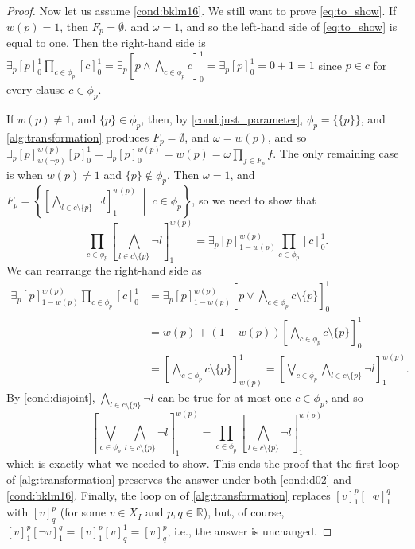 \begin{proof}
  Now let us assume \cref{cond:bklm16}. We still want to prove
  \cref{eq:to_show}. If $w(p) = 1$, then $F_p = \emptyset$, and $\omega = 1$,
  and so the left-hand side of \cref{eq:to_show} is equal to one. Then the
  right-hand side is $\exists_p [p]_0^1 \prod_{c \in \phi_p} [c]_0^1 = \exists_p
  \left[ p \land \bigwedge_{c \in \phi_p} c \right]_0^1 = \exists_p [p]_0^1 = 0
  + 1 = 1$ since $p \in c$ for every clause $c \in \phi_p$.

  If $w(p) \ne 1$, and $\{ p \} \in \phi_p$, then, by
  \cref{cond:just_parameter}, $\phi_p = \{ \{ p \} \}$, and
  \cref{alg:transformation} produces $F_p = \emptyset$, and $\omega = w(p)$, and
  so $\exists_p [p]_{w(\neg p)}^{w(p)} [p]_0^1 = \exists_p [p]^{w(p)}_0 = w(p) =
  \omega \prod_{f \in F_p} f$. The only remaining case is when $w(p) \ne 1$ and
  $\{ p \} \not \in \phi_p$. Then $\omega = 1$, and $F_p = \left\{
    \left[\bigwedge_{l \in c \setminus \{ p \}} \neg l\right]_1^{w(p)}
    \;\middle|\; c \in \phi_p \right\}$, so we need to show that
    \[
    \prod_{c \in \phi_p} \left[\bigwedge_{l \in c \setminus \{p \}} \neg l\right]_1^{w(p)} = \exists_p [p]_{1-w(p)}^{w(p)} \prod_{c \in \phi_p} [c]_0^1.
    \]
    We can rearrange the right-hand side as
  \begin{align*}
    \exists_p [p]_{1-w(p)}^{w(p)} \prod_{c \in \phi_p} [c]_0^1 &= \exists_p [p]_{1-w(p)}^{w(p)} \left[ p \lor \bigwedge_{c \in \phi_p} c \setminus \{ p \} \right]_0^1 \\
                                                               &= w(p) + (1-w(p)) \left[ \bigwedge_{c \in \phi_p} c \setminus \{ p \} \right]_0^1 \\
                                                               &= \left[ \bigwedge_{c \in \phi_p} c \setminus \{ p \} \right]_{w(p)}^1 = \left[ \bigvee_{c \in \phi_p} \bigwedge_{l \in c \setminus \{ p \}} \neg l \right]_1^{w(p)}.
  \end{align*}
  By \cref{cond:disjoint}, $\bigwedge_{l \in c \setminus \{ p \}} \neg l$ can be
  true for at most one $c \in \phi_p$, and so
  \[
    \left[ \bigvee_{c \in \phi_p} \bigwedge_{l \in c \setminus \{ p \}} \neg l \right]_1^{w(p)} = \prod_{c \in \phi_p} \left[ \bigwedge_{l \in c \setminus \{ p \}} \neg l \right]_1^{w(p)}
  \]
  which is exactly what we needed to show. This ends the proof that the first
  loop of \cref{alg:transformation} preserves the answer under both
  \cref{cond:d02} and \cref{cond:bklm16}. Finally, the loop on
   of \cref{alg:transformation}
  replaces $[v]_1^p[\neg v]_1^q$ with $[v]_q^p$ (for some $v \in X_I$ and
  $p, q \in \mathbb{R}$), but, of course,
  $[v]_1^p[\neg v]_1^q = [v]_1^p[v]_q^1 = [v]_q^p$, i.e., the answer is
  unchanged.
\end{proof}


